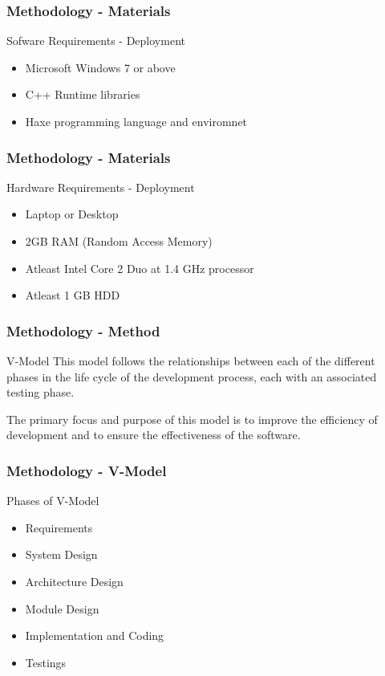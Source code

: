 \documentclass[handout]{beamer}
\begin{document}
\begin{frame}
	\frametitle{Methodology - Materials}
	\begin{block}{Sofware Requirements - Deployment}
		\begin{itemize}
			\item<1-> Microsoft Windows 7 or above
			\item<2-> C++ Runtime libraries
			\item<3-> Haxe programming language and enviromnet
		\end{itemize}
	\end{block}
\end{frame}

\begin{frame}
	\frametitle{Methodology - Materials}
	\begin{block}{Hardware Requirements - Deployment}
		\begin{itemize}
			\item<1-> Laptop or Desktop
			\item<2-> 2GB RAM (Random Access Memory)
			\item<3-> Atleast Intel Core 2 Duo at 1.4 GHz processor
			\item<4-> Atleast 1 GB HDD
		\end{itemize}
	\end{block}
\end{frame}

\begin{frame}
	\frametitle{Methodology - Method}

	\begin{block}{V-Model}
		This model follows the relationships between each of the different phases
		in the life cycle of the development process, each with an associated
		testing phase.

		The primary focus and purpose of this model is to improve the efficiency of
		development and to ensure the effectiveness of the software.
	\end{block}
\end{frame}

\begin{frame}
	\frametitle{Methodology - V-Model}
	\begin{block}{Phases of V-Model}
		\begin{itemize}
			\item<1-> Requirements
			\item<2-> System Design
			\item<3-> Architecture Design
			\item<4-> Module Design
			\item<5-> Implementation and Coding
			\item<6-> Testings
		\end{itemize}
	\end{block}
\end{frame}
\end{document}
